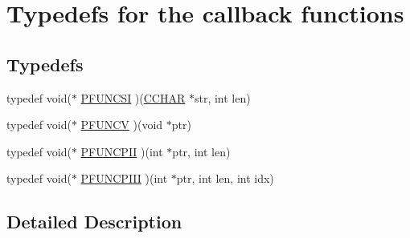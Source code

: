 \hypertarget{group__aaa}{\section{Typedefs for the callback functions}
\label{group__aaa}
}
\subsection*{Typedefs}
\begin{DoxyCompactItemize}
\item 
typedef void($\ast$ \hyperlink{group__aaa_ga7e349c93ace11348420a92541037633f}{P\-F\-U\-N\-C\-S\-I} )(\hyperlink{wflib_8h_a50a88b13633a8142e9172fb5124d729a}{C\-C\-H\-A\-R} $\ast$str, int len)
\item 
typedef void($\ast$ \hyperlink{group__aaa_gabd2ffb59694ebdbd52d3b3e6d542aa6a}{P\-F\-U\-N\-C\-V} )(void $\ast$ptr)
\item 
typedef void($\ast$ \hyperlink{group__aaa_ga795a6adf3616634e5b08bd6fee1712b1}{P\-F\-U\-N\-C\-P\-I\-I} )(int $\ast$ptr, int len)
\item 
typedef void($\ast$ \hyperlink{group__aaa_ga251b4a18d7e619691556a3bf65c3ba38}{P\-F\-U\-N\-C\-P\-I\-I\-I} )(int $\ast$ptr, int len, int idx)
\end{DoxyCompactItemize}


\subsection{Detailed Description}


